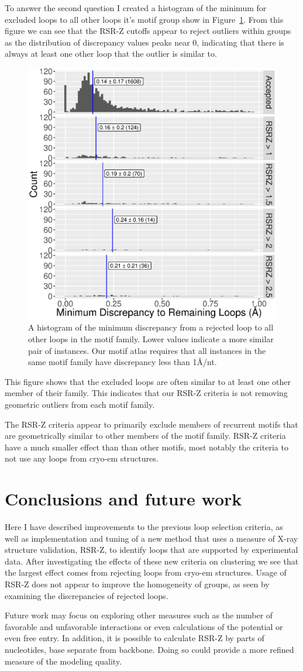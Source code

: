 To answer the second question I created a histogram of the minimum for excluded
loops to all other loops it's motif group show in
Figure~\ref{fig:exclude-min-disc}. From this figure we can see that the RSR-Z
cutoffs appear to reject outliers within groups as the distribution of
discrepancy values peaks near 0, indicating that there is always at least one
other loop that the outlier is similar to.

\begin{figure}
  \includegraphics[width=0.5\linewidth]{chapter-5/figs/motifs/discrepancy-to-kept}
  \caption{A histogram of the minimum discrepancy from a rejected loop to all
    other loops in the motif family. Lower values indicate a more similar pair
    of instances. Our motif atlas requires that all instances in the same motif
  family have discrepancy less than 1{\AA}/nt.}
\label{fig:exclude-min-disc}
\end{figure}

This figure shows that the excluded loops are often similar to at least one
other member of their family. This indicates that our RSR-Z criteria is not
removing geometric outliers from each motif family.

The RSR-Z criteria appear to primarily exclude members of recurrent motifs that
are geometrically similar to other members of the motif family. RSR-Z criteria
have a much smaller effect than than other motifs, most notably the criteria to
not use any loops from cryo-em structures.

\section{Conclusions and future work}

Here I have described improvements to the previous loop selection criteria, as
well as implementation and tuning of a new method that uses a measure of X-ray
structure validation, RSR-Z, to identify loops that are supported by
experimental data. After investigating the effects of these new criteria on
clustering we see that the largest effect comes from rejecting loops from
cryo-em structures. Usage of RSR-Z does not appear to improve the homogeneity of
groups, as seen by examining the discrepancies of rejected loops.

Future work may focus on exploring other measures such as the number of
favorable and unfavorable interactions or even calculations of the potential or
even free entry. In addition, it is possible to calculate RSR-Z by parts of
nucleotides, base separate from backbone. Doing so could provide a more refined
measure of the modeling quality.

